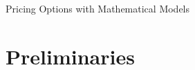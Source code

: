 \documentclass[9pt]{extarticle}
\begin{document}
\begin{titlepage}
    Pricing Options with Mathematical Models
\end{titlepage}
\tableofcontents
\newpage
\section{Preliminaries}
\end{document}
